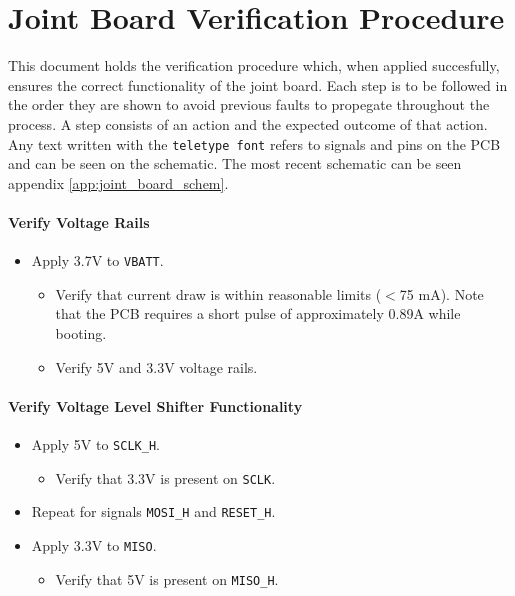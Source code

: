 \section{Joint Board Verification Procedure} %
\label{sec:joint_board_verification_procedure}
This document holds the verification procedure which, when applied succesfully, ensures the correct functionality of the joint board.
Each step is to be followed in the order they are shown to avoid previous faults to propegate throughout the process.
A step consists of an action and the expected outcome of that action.
Any text written with the \texttt{teletype font} refers to signals and pins on the PCB and can be seen on the schematic.
The most recent schematic can be seen appendix \ref{app:joint_board_schem}.

\paragraph{Verify Voltage Rails} 
 \begin{itemize}
 	\item Apply 3.7V to \texttt{VBATT}.
 	\begin{itemize}
 		\item Verify that current draw is within reasonable limits ($<$75 mA). Note that the PCB requires a short pulse of approximately 0.89A while booting.
 		\item Verify 5V and 3.3V voltage rails.
 	\end{itemize}
 \end{itemize}

\paragraph{Verify Voltage Level Shifter Functionality}
\begin{itemize}
	\item Apply 5V to \texttt{SCLK\_H}.
	\begin{itemize}
		\item  Verify that 3.3V is present on \texttt{SCLK}.
	\end{itemize}
	\item Repeat for signals \texttt{MOSI\_H} and \texttt{RESET\_H}.
	\item Apply 3.3V to \texttt{MISO}.
	\begin{itemize}
		\item  Verify that 5V is present on \texttt{MISO\_H}.
	\end{itemize}
\end{itemize}


